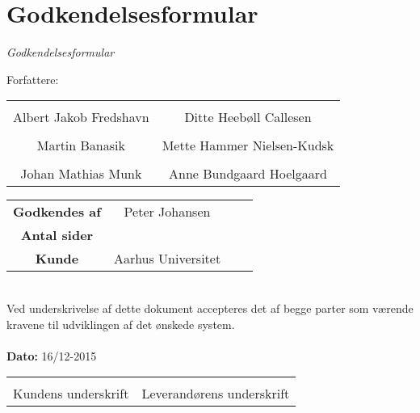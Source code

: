 \chapter{Godkendelsesformular}

{\LARGE\textit{Godkendelsesformular}}

{\large Forfattere:}
\\[5ex]


\begin{tabular}{c c}
\centering 
	\makebox[2.0in]{\hrulefill} & \makebox[2.0in]{\hrulefill}\\
	Albert Jakob Fredshavn & Ditte Heebøll Callesen\\[7ex]
	\makebox[2.0in]{\hrulefill} & \makebox[2.0in]{\hrulefill}\\
	Martin Banasik & Mette Hammer Nielsen-Kudsk\\[7ex]
	\makebox[2.0in]{\hrulefill} & \makebox[2.0in]{\hrulefill}\\
	Johan Mathias Munk & Anne Bundgaard Hoelgaard\\[7ex]
	

\end{tabular}

\begin{tabular}{c c c c}
	\textbf{Godkendes af} & Peter Johansen\\[3ex]
	\textbf{Antal sider} & \pageref{LastPage} \\[3ex]
	\textbf{Kunde} & Aarhus Universitet
\end{tabular}\\[8ex]
Ved underskrivelse af dette dokument accepteres det af begge parter som værende kravene til udviklingen af det ønskede system.
\\
\\
\textbf{Dato: } 16/12-2015\\[7ex]

\begin{tabular}{c c}
	\makebox[2.0in]{\hrulefill} & \makebox[2.0in]{\hrulefill}\\
	\centering 
	Kundens underskrift & Leverandørens underskrift
\end{tabular}
